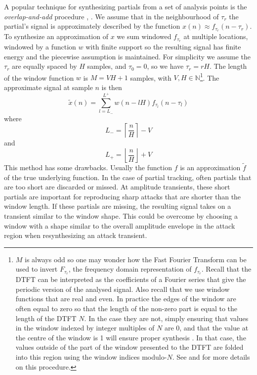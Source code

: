 A popular technique for synthesizing partials from a set of analysis points is
the \textit{overlap-and-add} procedure \cite{portnoff1976implementation},
\cite{moore1990elements}. We assume that in the neighbourhood of $\tau_{r}$ the
partial's signal is approximately described by the function $x(n) \approx
f_{\tau_{r}}(n-\tau_{r})$. To synthesize an approximation of $x$ we sum windowed
$f_{\tau_{r}}$ at multiple locations, windowed by a function $w$ with finite
support so the resulting signal has finite energy and the piecewise assumption
is maintained. For simplicity we assume the $\tau_{r}$ are equally spaced by $H$
samples, and $\tau_{0}=0$, so we have $\tau_{r} = rH$. The length of the window
function $w$ is $M = VH + 1$ samples, with $V,H \in \mathbb{N}%
$\footnote{%
    $M$ is always odd so one may wonder how the Fast Fourier Transform can be
    used to invert $F_{\tau_{r}}$, the frequency domain representation of
    $f_{\tau_{r}}$.  Recall that the DTFT can be interpreted as the coefficients
    of a Fourier series that give the periodic version of the analysed signal.
    Also recall that we use window functions that are real and even. In practice
    the edges of the window are often equal to zero so that the length of the
    non-zero part is equal to the length of the DTFT $N$. In the case they are
    not, simply ensuring that values in the window indexed by integer multiples
    of $N$ are 0, and that the value at the centre of the window is 1 will ensure proper
    synthesis \cite[p.~244]{portnoff1976implementation}. In that case, the values
    outside of the part of the window presented to the DTFT are folded into this
    region using the window indices modulo-$N$. See
    \cite{portnoff1976implementation} and \cite{moore1990elements} for more details on this
    procedure.%
}.
The approximate signal at sample $n$ is then
\[
    \tilde{x}(n) = \sum_{l=L_{-}}^{L^{+}} w(n-lH) f_{\tau_l}(n-\tau_l)
\]
where
\[
    L_{-} = \left\lceil \frac{n}{H} \right\rceil - V
\]
and
\[
    L_{+} = \left\lfloor \frac{n}{H} \right\rfloor + V
\]
This method has some drawbacks. Usually the function $f$ is an approximation
$\tilde{f}$ of the true underlying function. In the case of partial tracking,
often partials that are too short are discarded or missed. At amplitude
transients, these short partials are important for reproducing sharp attacks
that are shorter than the window length. If these partials are missing, the
resulting signal takes on a transient similar to the window shape. This could be
overcome by choosing a window with a shape similar to the overall amplitude
envelope in the attack region when resynthesizing an attack transient.

